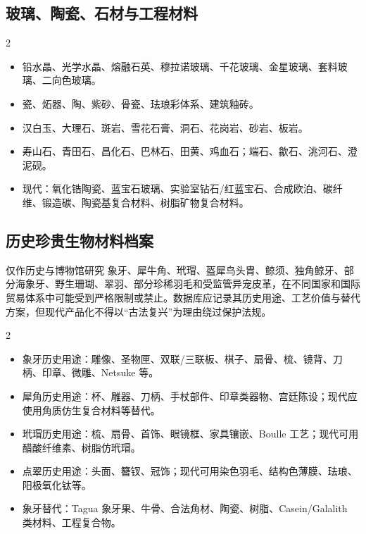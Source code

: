 \documentclass[lang=en,a4paper,11pt]{elegantpaper}
\begin{document}
\subsection{玻璃、陶瓷、石材与工程材料}


\begin{multicols}{2}
\begin{itemize}
\item 铅水晶、光学水晶、熔融石英、穆拉诺玻璃、千花玻璃、金星玻璃、套料玻璃、二向色玻璃。
\item 瓷、炻器、陶、紫砂、骨瓷、珐琅彩体系、建筑釉砖。
\item 汉白玉、大理石、斑岩、雪花石膏、洞石、花岗岩、砂岩、板岩。
\item 寿山石、青田石、昌化石、巴林石、田黄、鸡血石；端石、歙石、洮河石、澄泥砚。
\item 现代：氧化锆陶瓷、蓝宝石玻璃、实验室钻石/红蓝宝石、合成欧泊、碳纤维、锻造碳、陶瓷基复合材料、树脂矿物复合材料。
\end{itemize}
\end{multicols}

\subsection{历史珍贵生物材料档案}


\begin{legalbox}{仅作历史与博物馆研究}
象牙、犀牛角、玳瑁、盔犀鸟头胄、鲸须、独角鲸牙、部分海象牙、野生珊瑚、翠羽、部分珍稀羽毛和受监管异宠皮革，在不同国家和国际贸易体系中可能受到严格限制或禁止。数据库应记录其历史用途、工艺价值与替代方案，但现代产品化不得以“古法复兴”为理由绕过保护法规。
\end{legalbox}

\begin{multicols}{2}
\begin{itemize}
\item 象牙历史用途：雕像、圣物匣、双联/三联板、棋子、扇骨、梳、镜背、刀柄、印章、微雕、Netsuke 等。
\item 犀角历史用途：杯、雕器、刀柄、手杖部件、印章类器物、宫廷陈设；现代应使用角质仿生复合材料等替代。
\item 玳瑁历史用途：梳、扇骨、首饰、眼镜框、家具镶嵌、Boulle 工艺；现代可用醋酸纤维素、树脂仿玳瑁。
\item 点翠历史用途：头面、簪钗、冠饰；现代可用染色羽毛、结构色薄膜、珐琅、阳极氧化钛等。
\item 象牙替代：Tagua 象牙果、牛骨、合法角材、陶瓷、树脂、Casein/Galalith 类材料、工程复合物。
\end{itemize}
\end{multicols}
\end{document}
